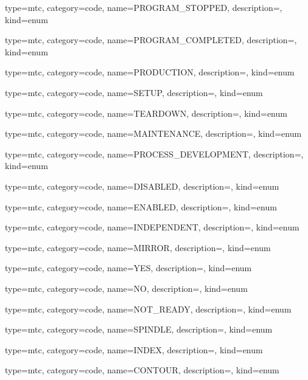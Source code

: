 {
  type=mtc,
  category=code,
  name={PROGRAM\_STOPPED},
  description={},
  kind={enum}
}


{
  type=mtc,
  category=code,
  name={PROGRAM\_COMPLETED},
  description={},
  kind={enum}
}


{
  type=mtc,
  category=code,
  name={PRODUCTION},
  description={},
  kind={enum}
}


{
  type=mtc,
  category=code,
  name={SETUP},
  description={},
  kind={enum}
}


{
  type=mtc,
  category=code,
  name={TEARDOWN},
  description={},
  kind={enum}
}


{
  type=mtc,
  category=code,
  name={MAINTENANCE},
  description={},
  kind={enum}
}


{
  type=mtc,
  category=code,
  name={PROCESS\_DEVELOPMENT},
  description={},
  kind={enum}
}


{
  type=mtc,
  category=code,
  name={DISABLED},
  description={},
  kind={enum}
}


{
  type=mtc,
  category=code,
  name={ENABLED},
  description={},
  kind={enum}
}


{
  type=mtc,
  category=code,
  name={INDEPENDENT},
  description={},
  kind={enum}
}


{
  type=mtc,
  category=code,
  name={MIRROR},
  description={},
  kind={enum}
}


{
  type=mtc,
  category=code,
  name={YES},
  description={},
  kind={enum}
}


{
  type=mtc,
  category=code,
  name={NO},
  description={},
  kind={enum}
}


{
  type=mtc,
  category=code,
  name={NOT\_READY},
  description={},
  kind={enum}
}


{
  type=mtc,
  category=code,
  name={SPINDLE},
  description={},
  kind={enum}
}


{
  type=mtc,
  category=code,
  name={INDEX},
  description={},
  kind={enum}
}


{
  type=mtc,
  category=code,
  name={CONTOUR},
  description={},
  kind={enum}
}


